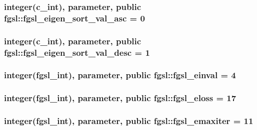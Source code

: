 \hypertarget{classfgsl_ad37ba047f5c1bbd5e2621f94d81a5aa4}{
\subsubsection[{fgsl\-\_\-eigen\-\_\-sort\-\_\-val\-\_\-asc}]{\setlength{\rightskip}{0pt plus 5cm}integer(c\-\_\-int), parameter, public fgsl\-::fgsl\-\_\-eigen\-\_\-sort\-\_\-val\-\_\-asc = 0}}\label{classfgsl_ad37ba047f5c1bbd5e2621f94d81a5aa4}
\hypertarget{classfgsl_a2dac34cd764be6e7de1f57d061c7f5d2}{
\subsubsection[{fgsl\-\_\-eigen\-\_\-sort\-\_\-val\-\_\-desc}]{\setlength{\rightskip}{0pt plus 5cm}integer(c\-\_\-int), parameter, public fgsl\-::fgsl\-\_\-eigen\-\_\-sort\-\_\-val\-\_\-desc = 1}}\label{classfgsl_a2dac34cd764be6e7de1f57d061c7f5d2}
\hypertarget{classfgsl_a720540845b1b10b1af117475a2b5f2c7}{
\subsubsection[{fgsl\-\_\-einval}]{\setlength{\rightskip}{0pt plus 5cm}integer({\bf fgsl\-\_\-int}), parameter, public fgsl\-::fgsl\-\_\-einval = 4}}\label{classfgsl_a720540845b1b10b1af117475a2b5f2c7}
\hypertarget{classfgsl_afdf53f6a99fb8880de40cd8136bf8e1c}{
\subsubsection[{fgsl\-\_\-eloss}]{\setlength{\rightskip}{0pt plus 5cm}integer({\bf fgsl\-\_\-int}), parameter, public fgsl\-::fgsl\-\_\-eloss = 17}}\label{classfgsl_afdf53f6a99fb8880de40cd8136bf8e1c}
\hypertarget{classfgsl_a5e63249fa198903f233261cb159a3e28}{
\subsubsection[{fgsl\-\_\-emaxiter}]{\setlength{\rightskip}{0pt plus 5cm}integer({\bf fgsl\-\_\-int}), parameter, public fgsl\-::fgsl\-\_\-emaxiter = 11}}\label{classfgsl_a5e63249fa198903f233261cb159a3e28}
